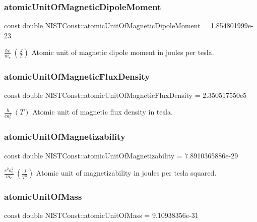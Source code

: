 \subsubsection{\texorpdfstring{atomic\+Unit\+Of\+Magnetic\+Dipole\+Moment}{atomicUnitOfMagneticDipoleMoment}}
{\footnotesize\ttfamily const double N\+I\+S\+T\+Const\+::atomic\+Unit\+Of\+Magnetic\+Dipole\+Moment = 1.\+854801999e-\/23}

$\frac{\hbar e}{m_e} \ (\frac{J}{T})$ Atomic unit of magnetic dipole moment in joules per tesla. \mbox{\label{group___atomic_unit_gaaf4c9b5c25a5e1bee2f65c8a82e0ee63}} 
\subsubsection{\texorpdfstring{atomic\+Unit\+Of\+Magnetic\+Flux\+Density}{atomicUnitOfMagneticFluxDensity}}
{\footnotesize\ttfamily const double N\+I\+S\+T\+Const\+::atomic\+Unit\+Of\+Magnetic\+Flux\+Density = 2.\+350517550e5}

$\frac{\hbar}{e a_0^2} \ (T)$ Atomic unit of magnetic flux density in tesla. \mbox{\label{group___atomic_unit_ga9c2b29b9a46e8dfd78837ef0c8a16bec}} 
\subsubsection{\texorpdfstring{atomic\+Unit\+Of\+Magnetizability}{atomicUnitOfMagnetizability}}
{\footnotesize\ttfamily const double N\+I\+S\+T\+Const\+::atomic\+Unit\+Of\+Magnetizability = 7.\+8910365886e-\/29}

$\frac{e^2a_0^2}{m_e} \ (\frac{J}{T^2})$ Atomic unit of magnetizability in joules per tesla squared. \mbox{\label{group___atomic_unit_ga61a2da51489f7bb8965e9e4747db34a7}} 
\subsubsection{\texorpdfstring{atomic\+Unit\+Of\+Mass}{atomicUnitOfMass}}
{\footnotesize\ttfamily const double N\+I\+S\+T\+Const\+::atomic\+Unit\+Of\+Mass = 9.\+10938356e-\/31}

